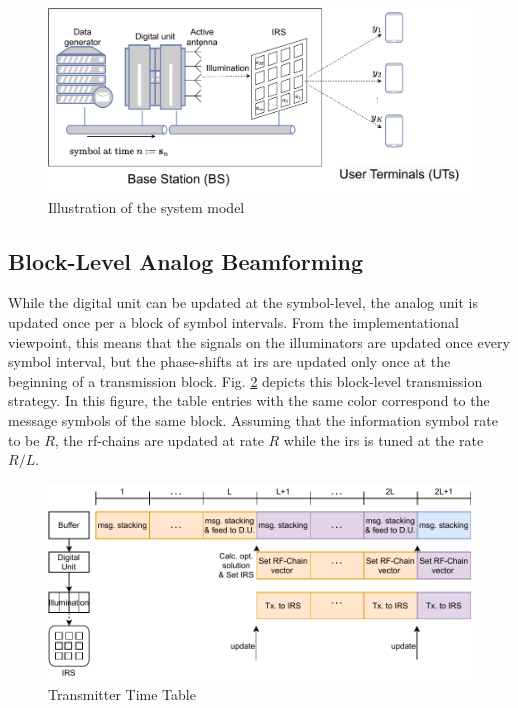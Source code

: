 \documentclass[12pt,draftclsnofoot,onecolumn,journal]{IEEEtran}
\begin{document}
\begin{figure}[t]\flushleft
	\includegraphics[width=6in]{sysmodel_illustration.pdf} 
	\caption{Illustration of the system model} \label{fig:sysmodel_illustration}
\end{figure}

\subsection{Block-Level Analog Beamforming}
While the digital unit can be updated at the symbol-level, the analog unit is updated once per a block of symbol intervals. From the implementational viewpoint, this means that the signals on the illuminators are updated once every symbol interval, but the phase-shifts at \ac{irs} are updated only once at the beginning of a transmission block. Fig. \ref{fig:abssys} depicts this block-level transmission strategy. In this figure, the table entries with the same color correspond to the message symbols of the same block. %
Assuming that the information symbol rate to be $R$, the \ac{rf}-chains are updated at rate $R$ while the \ac{irs} is tuned at the rate $R/L$.
\begin{figure}[t]\flushleft
	\includegraphics[width=6in]{modeltime.pdf} 
	\caption{Transmitter Time Table} \label{fig:abssys}
\end{figure}
\end{document}
